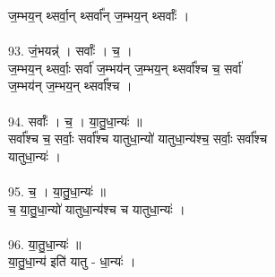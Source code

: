 ज॒म्भय॒न् थ्सर्वा॒न् थ्सर्वा᳚न् ज॒म्भय॒न् थ्सर्वाः᳚ ।\\
\\
93. जं॒भयन्न्॑ । सर्वाः᳚ । च॒ ।\\
ज॒म्भय॒न् थ्सर्वाः॒ सर्वा॑ ज॒म्भय॑न् ज॒म्भय॒न् थ्सर्वा᳚श्च च॒ सर्वा॑\\
ज॒म्भय॑न् ज॒म्भय॒न् थ्सर्वा᳚श्च ।\\
\\
94. सर्वाः᳚ । च॒ । या॒तु॒धा॒न्यः॑ ॥\\
सर्वा᳚श्च च॒ सर्वाः॒ सर्वा᳚श्च यातुधा॒न्यो॑ यातुधा॒न्य॑श्च॒ सर्वाः॒ सर्वा᳚श्च\\
यातुधा॒न्यः॑ ।\\
\\
95. च॒ । या॒तु॒धा॒न्यः॑ ॥\\
च॒ या॒तु॒धा॒न्यो॑ यातुधा॒न्य॑श्च च यातुधा॒न्यः॑ ।\\
\\
96. या॒तु॒धा॒न्यः॑ ॥\\
या॒तु॒धा॒न्य॑ इति॑ यातु - धा॒न्यः॑ ।\\
\\
